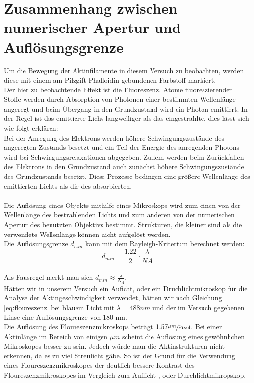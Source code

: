 \section{Zusammenhang zwischen numerischer Apertur und Auflösungsgrenze}
Um die Bewegung der Aktinfilamente in diesem Versuch zu beobachten, werden diese mit einem am Pilzgift Phalloidin gebundenen Farbstoff markiert.\\
Der hier zu beobachtende Effekt ist die Fluoreszenz. Atome fluoreszierender Stoffe werden durch Absorption von Photonen einer bestimmten Wellenlänge angeregt und beim Übergang in den Grundzustand wird ein Photon emittiert. In der Regel ist das emittierte Licht langwelliger als das eingestrahlte, dies lässt sich wie folgt erklären:\\
Bei der Anregung des Elektrons werden höhere Schwingungszustände des angeregten Zustands besetzt und ein Teil der Energie des anregenden Photons wird bei Schwingungsrelaxationen abgegeben. Zudem werden beim Zurückfallen des Elektrons in den Grundzustand auch zunächst höhere Schwingungszustände des Grundzustands besetzt. Diese Prozesse bedingen eine größere Wellenlänge des emittierten Lichts als die des absorbierten.\\
\\
Die Auflösung eines Objekts mithilfe eines Mikroskops wird zum einen von der Wellenlänge des bestrahlenden Lichts und zum anderen von der numerischen Apertur des benutzten Objektivs bestimmt. Strukturen, die kleiner sind als die verwendete Wellenlänge können nicht aufgelöst werden.\\
Die Auflösungsgrenze $d_{min}$ kann mit dem Rayleigh-Kriterium berechnet werden:
\begin{equation*}
d_{min}=\frac{1.22}{2}\cdot \frac{\lambda}{NA}
\label{eq:floureszenz}
\end{equation*}
\\
Als Fausregel merkt man sich $d_{min} \approx \frac{ \lambda}{N_{A}}$.\\
Hätten wir in unserem Versuch ein Auficht, oder ein Druchlichtmikroskop
für die Analyse der Aktingeschwindigkeit verwendet, hätten wir nach Gleichung \ref{eq:floureszenz} bei blauem
Licht mit $ \lambda = 488nm$ und der im Versuch gegebenen Linse eine
Auflösungsgrenze von 180 nm. \\
Die Auflösung des Floureszenzmikroskops beträgt $1.57 \sfrac{\mu m}{\text{Pixel}}$.
Bei einer Aktinlänge im Bereich von einigen $\mu m$ \cite{FOPRA_molecular_motors}
scheint die Auflösung eines gewöhnlichen Mikroskopes besser zu sein.
Jedoch würde man die Aktinstrukturen nicht erkennen, da es zu viel Streulicht gäbe.
So ist der Grund für die Verwendung eines Floureszenzmikroskopes der
deutlich bessere Kontrast des Floureszenzmikroskopes im Vergleich zum Auflicht-,
oder Durchlichtmikropskop.

